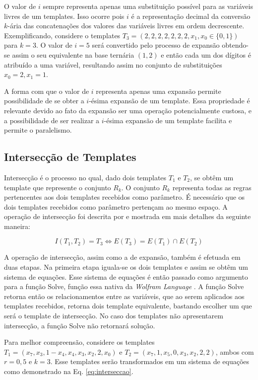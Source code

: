 O valor de $i$ sempre representa apenas uma substituição possível para as variáveis livres de um templates. Isso ocorre pois $i$ é a representação decimal da conversão $k$-ária das concatenações dos valores das variáveis livres em ordem decrescente. Exemplificando, considere o templates $T_3 = (2,2,2,2,2,2,2,x_1,x_0\in \{0,1\})$ para $k=3$. O valor de $i=5$ será convertido pelo processo de expansão obtendo-se assim o seu equivalente na base ternária $(1,2)$ e então cada um dos dígitos é atribuído a uma variável, resultando assim no conjunto de substituições ${x_0=2,x_1=1}$.

A forma com que o valor de $i$ representa apenas uma expansão permite possibilidade de se obter a $i$-ésima expansão de um template. Essa propriedade é relevante devido ao fato da expansão ser uma operação potencialmente custosa, e a possibilidade de ser realizar a $i$-ésima expansão de um template facilita e permite o paralelismo.

\newpage\newpage
\subsection{Intersecção de Templates}
Intersecção é o processo no qual, dado dois templates $T_1$ e $T_2$, se obtêm um template que represente o conjunto $R_k$. O conjunto $R_k$ representa todas as regras pertencentes aos dois templates recebidos como parâmetro. É necessário que os dois templates recebidos como parâmetro pertençam ao mesmo espaço. A operação de intersecção foi descrita por  e mostrada em mais detalhes da seguinte maneira:

\begin{equation}
I(T_1,T_2)=T_3 \Leftrightarrow E(T_3) = E(T_1) \cap E(T_2)
\end{equation}

A operação de intersecção, assim como a de expansão, também é efetuada em duas etapas. Na primeira etapa iguala-se os dois templates e assim se obtêm um sistema de equações. Esse sistema de equações é então passado como argumento para a função Solve, função essa nativa da \textit{Wolfram Language} \cite{woframMathematica10}. A função Solve retorna então os relacionamentos entre as variáveis, que ao serem aplicados aos templates recebidos, retorna dois template equivalente, bastando escolher um que será o template de intersecção. No caso dos templates não apresentarem intersecção, a função Solve não retornará solução.

Para melhor compreensão, considere os templates $T_1 = (x_7,x_3,1-x_4,x_4,x_3,x_2,2,x_0)$ e $T_2 = (x_7,1,x_5,0,x_3,x_2,2,2)$, ambos com $r=0{,}5$ e $k=3$. Esse templates serão transformados em um sistema de equações como demonstrado na Eq. \eqref{eq:interseccao}.

